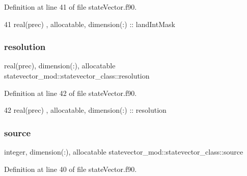 Definition at line 41 of file state\+Vector.\+f90.


\begin{DoxyCode}
41         \textcolor{keywordtype}{real(prec)} , \textcolor{keywordtype}{allocatable}, \textcolor{keywordtype}{dimension(:)} :: landIntMask
\end{DoxyCode}
\mbox{\label{structstatevector__mod_1_1statevector__class_a86a9cabd34ca23e8a4557b9369335f67}} 
\subsubsection{\texorpdfstring{resolution}{resolution}}
{\footnotesize\ttfamily real(prec), dimension(\+:), allocatable statevector\+\_\+mod\+::statevector\+\_\+class\+::resolution\hspace{0.3cm}{\ttfamily [private]}}



Definition at line 42 of file state\+Vector.\+f90.


\begin{DoxyCode}
42         \textcolor{keywordtype}{real(prec)} , \textcolor{keywordtype}{allocatable}, \textcolor{keywordtype}{dimension(:)} :: resolution
\end{DoxyCode}
\mbox{\label{structstatevector__mod_1_1statevector__class_a26d6d27fd085846016d83c6e38781416}} 
\subsubsection{\texorpdfstring{source}{source}}
{\footnotesize\ttfamily integer, dimension(\+:), allocatable statevector\+\_\+mod\+::statevector\+\_\+class\+::source\hspace{0.3cm}{\ttfamily [private]}}



Definition at line 40 of file state\+Vector.\+f90.


